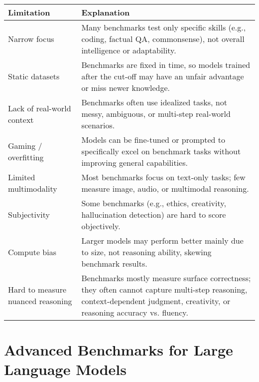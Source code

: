 \documentclass[a4paper, 12pt]{article}
\begin{document}
\begin{tabularx}{\textwidth}{|>{\hsize}L|>{\hsize}L|}
\hline
\textbf{Limitation} & \textbf{Explanation} \\
\hline
Narrow focus & Many benchmarks test only specific skills (e.g., coding, factual QA, commonsense), not overall intelligence or adaptability. \\
\hline
Static datasets & Benchmarks are fixed in time, so models trained after the cut-off may have an unfair advantage or miss newer knowledge. \\
\hline
Lack of real-world context & Benchmarks often use idealized tasks, not messy, ambiguous, or multi-step real-world scenarios. \\
\hline
Gaming / overfitting & Models can be fine-tuned or prompted to specifically excel on benchmark tasks without improving general capabilities. \\
\hline
Limited multimodality & Most benchmarks focus on text-only tasks; few measure image, audio, or multimodal reasoning. \\
\hline
Subjectivity & Some benchmarks (e.g., ethics, creativity, hallucination detection) are hard to score objectively. \\
\hline
Compute bias & Larger models may perform better mainly due to size, not reasoning ability, skewing benchmark results. \\
\hline
Hard to measure nuanced reasoning & Benchmarks mostly measure surface correctness; they often cannot capture multi-step reasoning, context-dependent judgment, creativity, or reasoning accuracy vs. fluency. \\
\hline
\end{tabularx}

\section*{Advanced Benchmarks for Large Language Models}
\end{document}
